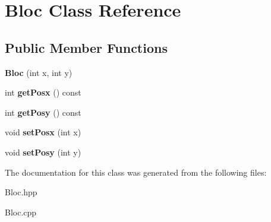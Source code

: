 \hypertarget{class_bloc}{}\section{Bloc Class Reference}
\label{class_bloc}
\subsection*{Public Member Functions}
\begin{DoxyCompactItemize}
\item 
\mbox{\label{class_bloc_a67d18e588715a983cf7980ae23d9e939}} 
{\bfseries Bloc} (int x, int y)
\item 
\mbox{\label{class_bloc_a1600764b66f921e77cb5ca8d2946a3e2}} 
int {\bfseries get\+Posx} () const
\item 
\mbox{\label{class_bloc_a362522a2a75cefdbba44a544cd7f1a75}} 
int {\bfseries get\+Posy} () const
\item 
\mbox{\label{class_bloc_a2d50fb680c5b8d3d3de2566a125d25a2}} 
void {\bfseries set\+Posx} (int x)
\item 
\mbox{\label{class_bloc_a361647f817b1f6202ee29c77e8f03f79}} 
void {\bfseries set\+Posy} (int y)
\end{DoxyCompactItemize}


The documentation for this class was generated from the following files\+:\begin{DoxyCompactItemize}
\item 
Bloc.\+hpp\item 
Bloc.\+cpp\end{DoxyCompactItemize}
